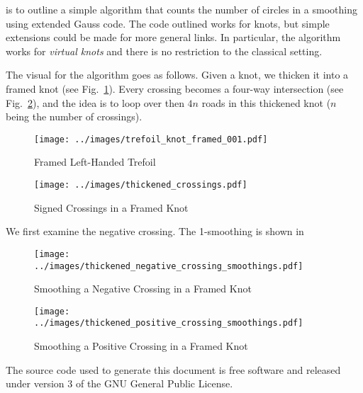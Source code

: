 \documentclass{article}
\theoremstyle{plain}
\begin{document}
        is to outline a simple algorithm that counts the number of circles in a
        smoothing using extended Gauss code. The code outlined works for knots,
        but simple extensions could be made for more general links. In
        particular, the algorithm works for \textit{virtual knots} and there is
        no restriction to the classical setting.
        \par\hfill\par
        The visual for the algorithm goes as follows. Given a knot, we thicken
        it into a framed knot (see Fig.~\ref{fig:trefoil_knot_framed_001}).
        Every crossing becomes a four-way intersection
        (see Fig.~\ref{fig:thickened_crossings}), and the idea is to loop
        over then $4n$ roads in this thickened knot ($n$ being the number of
        crossings).
        \begin{figure}
            \centering
            \texttt{[image: ../images/trefoil\_knot\_framed\_001.pdf]}
            \caption{Framed Left-Handed Trefoil}
            \label{fig:trefoil_knot_framed_001}
        \end{figure}
        \begin{figure}
            \centering
            \texttt{[image: ../images/thickened\_crossings.pdf]}
            \caption{Signed Crossings in a Framed Knot}
            \label{fig:thickened_crossings}
        \end{figure}
        We first examine the negative crossing. The 1-smoothing is shown in
        \begin{figure}
            \centering
            \texttt{[image: ../images/thickened\_negative\_crossing\_smoothings.pdf]}
            \caption{Smoothing a Negative Crossing in a Framed Knot}
            \label{fig:thickened_negative_crossing_smoothings}
        \end{figure}
        \begin{figure}
            \centering
            \texttt{[image: ../images/thickened\_positive\_crossing\_smoothings.pdf]}
            \caption{Smoothing a Positive Crossing in a Framed Knot}
            \label{fig:thickened_positive_crossing_smoothings}
        \end{figure}
    \newpage
    
    
    \newpage
    The source code used to generate this document is free software and released
    under version 3 of the GNU General Public License.
\end{document}
